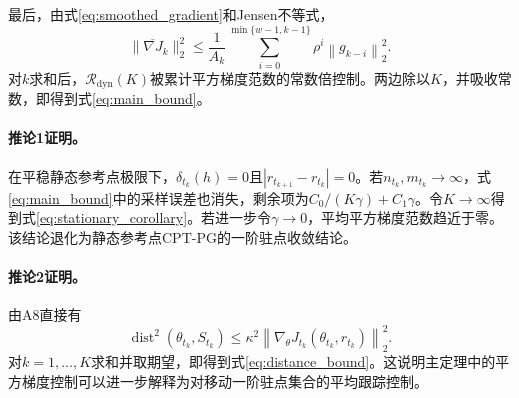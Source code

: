 最后，由式\eqref{eq:smoothed_gradient}和Jensen不等式，
\begin{equation}
\label{eq:smooth_jensen}
\|\overline{\nabla J}_k\|_2^2
\le
\frac{1}{A_k}
\sum_{i=0}^{\min\{w-1,k-1\}}
\rho^i
\left\|
g_{k-i}
\right\|_2^2.
\end{equation}
对$k$求和后，$\mathcal{R}_{\mathrm{dyn}}(K)$被累计平方梯度范数的常数倍控制。两边除以$K$，并吸收常数，即得到式\eqref{eq:main_bound}。

\paragraph{推论1证明。}
在平稳静态参考点极限下，$\delta_{t_k}(h)=0$且$|r_{t_{k+1}}-r_{t_k}|=0$。若$n_{t_k},m_{t_k}\to\infty$，式\eqref{eq:main_bound}中的采样误差也消失，剩余项为$C_0/(K\gamma)+C_1\gamma$。令$K\to\infty$得到式\eqref{eq:stationary_corollary}。若进一步令$\gamma\to0$，平均平方梯度范数趋近于零。该结论退化为静态参考点CPT-PG的一阶驻点收敛结论。

\paragraph{推论2证明。}
由A8直接有
\begin{equation*}
\operatorname{dist}^2(\theta_{t_k},S_{t_k})
\le
\kappa^2
\left\|
\nabla_\theta J_{t_k}(\theta_{t_k},r_{t_k})
\right\|_2^2.
\end{equation*}
对$k=1,\dots,K$求和并取期望，即得到式\eqref{eq:distance_bound}。这说明主定理中的平方梯度控制可以进一步解释为对移动一阶驻点集合的平均跟踪控制。
